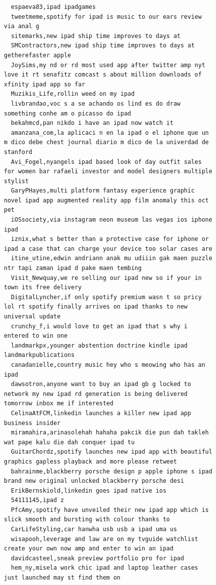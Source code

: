 \begin{figure}[htpb]
\begin{verbatim}
  espaeva83,ipad ipadgames
  tweetmeme,spotify for ipad is music to our ears review via anal g
  sitemarks,new ipad ship time improves to days at
  SMContractors,new ipad ship time improves to days at getherefaster apple
  JoySims,my nd or rd most used app after twitter amp nyt love it rt senafitz comcast s about million downloads of xfinity ipad app so far
  Muzikis_Life,rollin weed on my ipad
  livbrandao,voc s a se achando os lind es do draw something conhe am o picasso do ipad
  bekahmcd,pan nikdo i have an ipad now watch it
  amanzana_com,la aplicaci n en la ipad o el iphone que un m dico debe chest journal diario m dico de la univerdad de stanford
  Avi_Fogel,nyangels ipad based look of day outfit sales for women bar rafaeli investor and model designers multiple stylist
  GaryPHayes,multi platform fantasy experience graphic novel ipad app augmented reality app film anomaly this oct pet
  iOSsociety,via instagram neon museum las vegas ios iphone ipad
  iznix,what s better than a protective case for iphone or ipad a case that can charge your device too solar cases are
  itine_utine,edwin andriann anak mu udiiin gak maen puzzle ntr tapi zaman ipad d pake maen tembing
  Visit_Newquay,we re selling our ipad new so if your in town its free delivery
  DigitalLyncher,if only spotify premium wasn t so pricy lol rt spotify finally arrives on ipad thanks to new universal update
  crunchy_f,i would love to get an ipad that s why i entered to win one
  landmarkpx,younger abstention doctrine kindle ipad landmarkpublications
  canadanielle,country music hey who s meowing who has an ipad
  dawsotron,anyone want to buy an ipad gb g locked to network my new ipad rd generation is being delivered tomorrow inbox me if interested
  CelinaAtFCM,linkedin launches a killer new ipad app business insider
  miramahira,arinasolehah hahaha pakcik die pun dah takleh wat pape kalu die dah conquer ipad tu
  GuitarChordz,spotify launches new ipad app with beautiful graphics gapless playback and more please retweet
  bahrainme,blackberry porsche design p apple iphone s ipad brand new original unlocked blackberry porsche desi
  ErikBernskiold,linkedin goes ipad native ios
  54111145,ipad z
  PfcAmy,spotify have unveiled their new ipad app which is slick smooth and bursting with colour thanks to
  CarLifeStyling,car hanwha usb usb a ipad uma us
  wisapooh,leverage and law are on my tvguide watchlist create your own now amp and enter to win an ipad
  davidcasteel,sneak preview portfolio pro for ipad
  hem_ny,misela work chic ipad and laptop leather cases just launched may st find them on

\end{verbatim}
\end{figure}
